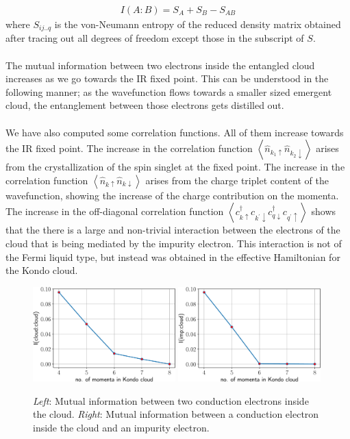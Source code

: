 \documentclass[twoside,11pt]{report}
\numberwithin{equation}{section}
\begin{document}
\begin{equation}\begin{aligned}
	I(A: B) = S_A + S_B - S_{AB}
\end{aligned}\end{equation}
where \(S_{ij..q}\) is the von-Neumann entropy of the reduced density matrix obtained after tracing out all degrees of freedom except those in the subscript of \(S\).
\\\\The mutual information between two electrons inside the entangled cloud increases as we go towards the IR fixed point. This can be understood in the following manner; as the wavefunction flows towards a smaller sized emergent cloud, the entanglement between those electrons gets distilled out.
\\\\We have also computed some correlation functions. All of them increase towards the IR fixed point. The increase in the correlation function \(\left<\hat n_{k_1 \uparrow} \hat n_{k_2 \downarrow} \right>\) arises from the crystallization of the spin singlet at the fixed point. The increase in the correlation function \(\left<\hat n_{k \uparrow} \hat n_{k \downarrow} \right>\) arises from the charge triplet content of the wavefunction, showing the increase of the charge contribution on the momenta. The increase in the off-diagonal correlation function \(\left< c^\dagger_{k \uparrow}c_{k^\prime \downarrow}c^\dagger_{q \downarrow}c_{q^\prime \uparrow}\right>\) shows that the there is a large and non-trivial interaction between the electrons of the cloud that is being mediated by the impurity electron. This interaction is not of the Fermi liquid type, but instead was obtained in the effective Hamiltonian for the Kondo cloud.
\begin{figure}[htpb!]
	\centering
	\includegraphics[width=0.49\textwidth]{../figures/mutI_ee.pdf}
	\includegraphics[width=0.49\textwidth]{../figures/mutI_d_e.pdf}
	\caption{\textit{Left}: Mutual information between two conduction electrons inside the cloud. \textit{Right}: Mutual information between a conduction electron inside the cloud and an impurity electron.}
	\label{mutI}
\end{figure}
\end{document}

